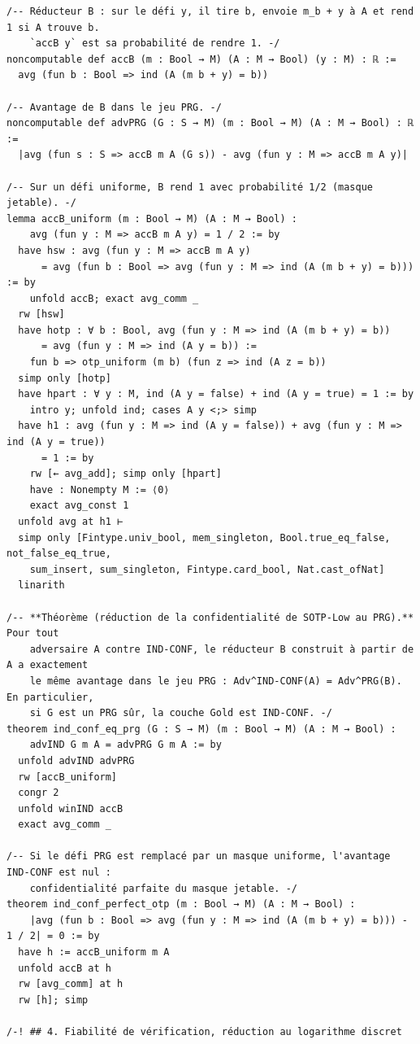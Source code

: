 \begin{lstlisting}[caption={M\'ecanisation r\'eduite des r\'eductions de SOTP-Low (version 1.0)}, label={lst:gamebased_lean}, language=Lean4]
/-- Réducteur B : sur le défi y, il tire b, envoie m_b + y à A et rend 1 si A trouve b.
    `accB y` est sa probabilité de rendre 1. -/
noncomputable def accB (m : Bool → M) (A : M → Bool) (y : M) : ℝ :=
  avg (fun b : Bool => ind (A (m b + y) = b))

/-- Avantage de B dans le jeu PRG. -/
noncomputable def advPRG (G : S → M) (m : Bool → M) (A : M → Bool) : ℝ :=
  |avg (fun s : S => accB m A (G s)) - avg (fun y : M => accB m A y)|

/-- Sur un défi uniforme, B rend 1 avec probabilité 1/2 (masque jetable). -/
lemma accB_uniform (m : Bool → M) (A : M → Bool) :
    avg (fun y : M => accB m A y) = 1 / 2 := by
  have hsw : avg (fun y : M => accB m A y)
      = avg (fun b : Bool => avg (fun y : M => ind (A (m b + y) = b))) := by
    unfold accB; exact avg_comm _
  rw [hsw]
  have hotp : ∀ b : Bool, avg (fun y : M => ind (A (m b + y) = b))
      = avg (fun y : M => ind (A y = b)) :=
    fun b => otp_uniform (m b) (fun z => ind (A z = b))
  simp only [hotp]
  have hpart : ∀ y : M, ind (A y = false) + ind (A y = true) = 1 := by
    intro y; unfold ind; cases A y <;> simp
  have h1 : avg (fun y : M => ind (A y = false)) + avg (fun y : M => ind (A y = true))
      = 1 := by
    rw [← avg_add]; simp only [hpart]
    have : Nonempty M := ⟨0⟩
    exact avg_const 1
  unfold avg at h1 ⊢
  simp only [Fintype.univ_bool, mem_singleton, Bool.true_eq_false, not_false_eq_true,
    sum_insert, sum_singleton, Fintype.card_bool, Nat.cast_ofNat]
  linarith

/-- **Théorème (réduction de la confidentialité de SOTP-Low au PRG).** Pour tout
    adversaire A contre IND-CONF, le réducteur B construit à partir de A a exactement
    le même avantage dans le jeu PRG : Adv^IND-CONF(A) = Adv^PRG(B). En particulier,
    si G est un PRG sûr, la couche Gold est IND-CONF. -/
theorem ind_conf_eq_prg (G : S → M) (m : Bool → M) (A : M → Bool) :
    advIND G m A = advPRG G m A := by
  unfold advIND advPRG
  rw [accB_uniform]
  congr 2
  unfold winIND accB
  exact avg_comm _

/-- Si le défi PRG est remplacé par un masque uniforme, l'avantage IND-CONF est nul :
    confidentialité parfaite du masque jetable. -/
theorem ind_conf_perfect_otp (m : Bool → M) (A : M → Bool) :
    |avg (fun b : Bool => avg (fun y : M => ind (A (m b + y) = b))) - 1 / 2| = 0 := by
  have h := accB_uniform m A
  unfold accB at h
  rw [avg_comm] at h
  rw [h]; simp

/-! ## 4. Fiabilité de vérification, réduction au logarithme discret


\end{lstlisting}
